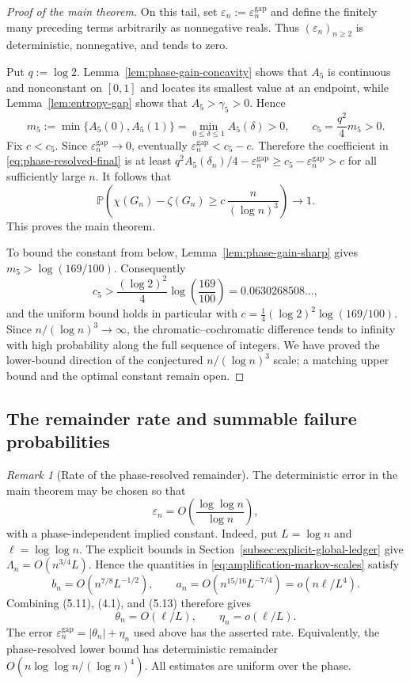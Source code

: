 \documentclass[a4paper,10pt,reqno]{amsart}
\numberwithin{equation}{section}
\newcommand{\displayheading}[1]{\par\addvspace{0.68\baselineskip}\noindent{\scshape #1.}\par\nobreak\smallskip\noindent}
\theoremstyle{plain}
\theoremstyle{remark}
\newtheorem{remark}[theorem]{Remark}
\begin{document}
\begin{proof}[Proof of the main theorem]
On this tail, set $\varepsilon_n:=\varepsilon_n^{\mathrm{gap}}$ and define the
finitely many preceding terms arbitrarily as nonnegative reals. Thus
$(\varepsilon_n)_{n\ge2}$ is deterministic, nonnegative, and tends to zero.

\displayheading{The uniform coefficient}

Put $q:=\log 2$.
Lemma~\ref{lem:phase-gain-concavity} shows that $A_5$ is continuous and
nonconstant on $[0,1]$ and locates its smallest value at an endpoint, while
Lemma~\ref{lem:entropy-gap} shows that $A_5>\gamma_5>0$. Hence
\[
  m_5:=\min\{A_5(0),A_5(1)\}
      =\min_{0\le\delta\le1}A_5(\delta)>0,
  \qquad
  c_5=\frac{q^2}{4}m_5>0.
\]
Fix $c<c_5$. Since $\varepsilon_n^{\mathrm{gap}}\to0$, eventually
$\varepsilon_n^{\mathrm{gap}}<c_5-c$. Therefore the coefficient in
\eqref{eq:phase-resolved-final} is at least
$q^2A_5(\delta_n)/4-\varepsilon_n^{\mathrm{gap}}\ge
c_5-\varepsilon_n^{\mathrm{gap}}>c$ for all sufficiently large $n$.
It follows that
\[
  \mathbb P\!\left(
    \chi(G_n)-\zeta(G_n)
    \ge
    c\,\frac{n}{(\log n)^3}
  \right)
  \longrightarrow1.
\]
This proves the main theorem.

To bound the constant from below, Lemma~\ref{lem:phase-gain-sharp} gives
$m_5>\log(169/100)$. Consequently
\[
  c_5>\frac{(\log 2)^2}{4}\log\!\left(\frac{169}{100}\right)
  =0.0630268508\ldots,
\]
and the uniform bound holds in particular with
$c=\frac14(\log 2)^2\log(169/100)$. Since $n/(\log n)^3\to\infty$, the
chromatic--cochromatic difference tends to infinity with high probability
along the full sequence of integers.  We have proved the lower-bound direction
of the conjectured $n/(\log n)^3$ scale; a matching upper bound and the optimal
constant remain open.
\end{proof}

\subsection*{The remainder rate and summable failure probabilities}

\begin{remark}[Rate of the phase-resolved remainder]
\label{rem:phase-remainder-rate}
The deterministic error in the main theorem may be chosen so that
\[
 \varepsilon_n=O\!\left(\frac{\log\log n}{\log n}\right),
\]
with a phase-independent implied constant. Indeed, put \(L=\log n\) and
\(\ell=\log\log n\). The explicit bounds in
Section~\ref{subsec:explicit-global-ledger} give
\(\Lambda_n=O(n^{3/4}L)\). Hence the quantities in
\eqref{eq:amplification-markov-scales} satisfy
\[
 b_n=O(n^{7/8}L^{-1/2}),\qquad
 a_n=O(n^{15/16}L^{-7/4})=o(n\ell/L^4).
\]
Combining (5.11), (4.1), and (5.13) therefore gives
\[
 \theta_n=O(\ell/L),\qquad \eta_n=o(\ell/L).
\]
The error \(\varepsilon_n^{\mathrm{gap}}=|\theta_n|+\eta_n\) used above
has the asserted rate. Equivalently, the phase-resolved lower bound has
deterministic remainder \(O(n\log\log n/(\log n)^4)\).
All estimates are uniform over the phase.
\end{remark}
\end{document}

